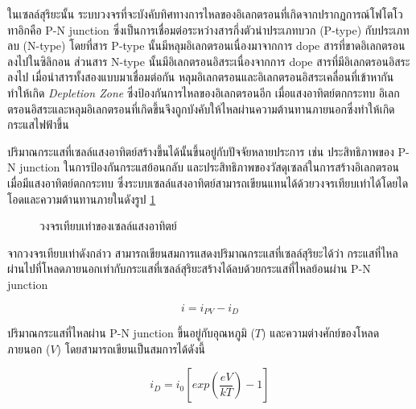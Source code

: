 \message{ !name(solar.tex)}\documentclass[
a4paper,
svgnames,
openany,
justified,
]{tufte-book}
\begin{document}
ในเซลล์สุริยะนั้น ระบบวงจรที่จะบังคับทิศทางการไหลของอิเลกตรอนที่เกิดจากปรากฏการณ์โฟโตโวทาอิกคือ P-N junction ซึ่งเป็นการเชื่อมต่อระหว่างสารกึ่งตัวนำประเภทบวก (P-type) กับประเภทลบ (N-type) โดยที่สาร P-type นั้นมีหลุมอิเลกตรอนเนื่องมาจากการ dope สารที่ขาดอิเลกตรอนลงไปในซิลิกอน ส่วนสาร N-type นั้นมีอิเลกตรอนอิสระเนื่องจากการ dope สารที่มีอิเลกตรอนอิสระลงไป เมื่อนำสารทั้งสองแบบมาเชื่อมต่อกัน หลุมอิเลกตรอนและอิเลกตรอนอิสระเคลื่อนที่เข้าหากันทำให้เกิด \emph{Depletion Zone} ซึ่งป้องกันการไหลของอิเลกตรอนอีก เมื่อแสงอาทิตย์ตกกระทบ อิเลกตรอนอิสระและหลุมอิเลกตรอนที่เกิดขึ้นจึงถูกบังคับให้ไหลผ่านความต้านทานภายนอกซึ่งทำให้เกิดกระแสไฟฟ้าขึ้น

ปริมาณกระแสที่เซลล์แสงอาทิตย์สร้างขึ้นได้นั้นขึ้นอยู่กับปัจจัยหลายประการ เช่น ประสิทธิภาพของ P-N junction ในการป้องกันกระแสย้อนกลับ และประสิทธิภาพของวัสดุเซลล์ในการสร้างอิเลกตรอนเมื่อมีแสงอาทิตย์ตกกระทบ ซึ่งระบบเซลล์แสงอาทิตย์สามารถเขียนแทนได้ด้วยวงจรเทียบเท่าได้โดยไดโอดและความต้านทานภายในดังรูป \ref{fig: equiv circuit solar cell}

\begin{figure}[h]
  \centering
  \caption{วงจรเทียบเท่าของเซลล์แสงอาทิตย์}
  \label{fig: equiv circuit solar cell}
\end{figure}

จากวงจรเทียบเท่าดังกล่าว สามารถเขียนสมการแสดงปริมาณกระแสที่เซลล์สุริยะได้ว่า กระแสที่ไหลผ่านไปที่โหลดภายนอกเท่ากับกระแสที่เซลล์สุริยะสร้างได้ลบด้วยกระแสที่ไหลย้อนผ่าน P-N junction

\begin{equation}
  \label{eq: solar cell current density}
  i = i_{PV} - i_D  
\end{equation}

ปริมาณกระแสที่ไหลผ่าน P-N junction ขึ้นอยู่กับอุณหภูมิ ($T$) และความต่างศักย์ของโหลดภายนอก ($V$) โดยสามารถเขียนเป็นสมการได้ดังนี้

\begin{equation}
  \label{eq: pn current}
  i_D = i_0 \left[ exp \left( \frac{eV}{kT} \right) - 1 \right]
\end{equation}
\end{document}
